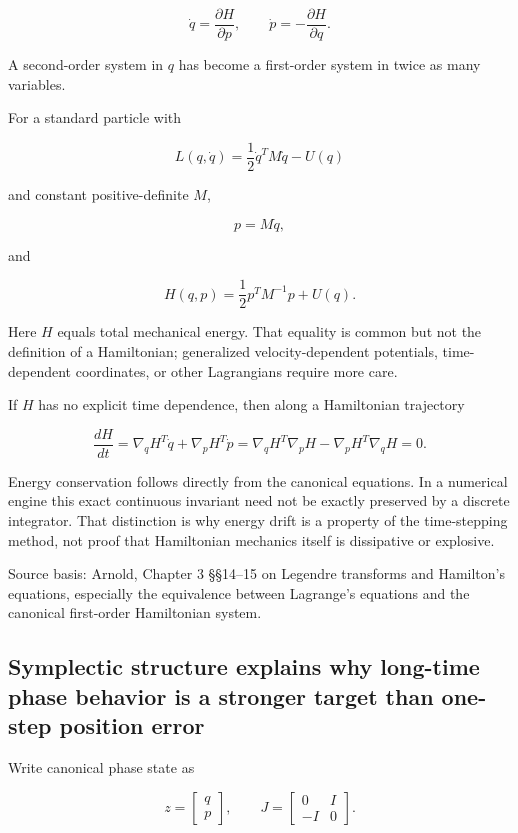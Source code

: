 \[
\boxed{
\dot q=
\frac{\partial H}{\partial p},
\qquad
\dot p=
-\frac{\partial H}{\partial q}.
}
\]

A second-order system in \(q\) has become a first-order system in twice as many variables.

For a standard particle with

\[
L(q,\dot q)
=
\frac12\dot q^TM\dot q-U(q)
\]

and constant positive-definite \(M\),

\[
p=M\dot q,
\]

and

\[
H(q,p)
=
\frac12p^TM^{-1}p+U(q).
\]

Here \(H\) equals total mechanical energy. That equality is common but not the definition of a Hamiltonian; generalized velocity-dependent potentials, time-dependent coordinates, or other Lagrangians require more care.

If \(H\) has no explicit time dependence, then along a Hamiltonian trajectory

\[
\frac{dH}{dt}
=
\nabla_qH^T\dot q
+
\nabla_pH^T\dot p
=
\nabla_qH^T\nabla_pH
-
\nabla_pH^T\nabla_qH
=
0.
\]

Energy conservation follows directly from the canonical equations. In a numerical engine this exact continuous invariant need not be exactly preserved by a discrete integrator. That distinction is why energy drift is a property of the time-stepping method, not proof that Hamiltonian mechanics itself is dissipative or explosive.

Source basis: Arnold, Chapter 3 §§14--15 on Legendre transforms and Hamilton's equations, especially the equivalence between Lagrange's equations and the canonical first-order Hamiltonian system.

\subsection{Symplectic structure explains why long-time phase behavior is a stronger target than one-step position error}\label{06-engine-ii-ch033-symplectic-structure-explains-why-long-time-phase-behavior-is-a-stronger-target-than-one-step-position-error}

\hypertarget{06-engine-ii-ch033-symplectic-structure-explains-why-long-time-phase-behavior-is-a-stronger-target-than-one-step-position-error}{}

Write canonical phase state as

\[
z=
\begin{bmatrix}
q\\p
\end{bmatrix},
\qquad
J=
\begin{bmatrix}
0&I\\
-I&0
\end{bmatrix}.
\]

